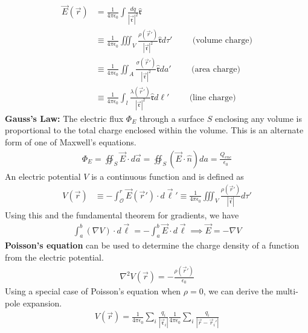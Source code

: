 \begin{align}
	\vec{E}(\vec{r}) &= \frac{1}{4\pi\epsilon_0}\int \frac{dq}{|\vec{\mathfrak{r}}|^2}\hat{\mathfrak{r}} \\
	&\equiv \frac{1}{4\pi\epsilon_0}\iiint_V \frac{\rho(\vec{r}')}{|\vec{\mathfrak{r}}|^2}\hat{\mathfrak{r}}d\tau'\hspace{1cm}\textrm{(volume charge)}\\
	&\equiv \frac{1}{4\pi\epsilon_0}\iint_A \frac{\sigma(\vec{r}')}{|\vec{\mathfrak{r}}|^2}\hat{\mathfrak{r}}da'\hspace{1cm}\textrm{(area charge)}\\
	&\equiv \frac{1}{4\pi\epsilon_0}\int_l \frac{\lambda(\vec{r}')}{|\vec{\mathfrak{r}}|^2}\hat{\mathfrak{r}}d\ell'\hspace{1cm}\textrm{(line charge)}
\end{align}
\textbf{Gauss's Law:} The electric flux $\Phi_E$ through a surface $S$ enclosing any volume is proportional to the total charge enclosed within the volume. This is an alternate form of one of Maxwell's equations.
\begin{align}
	\Phi_E = \oiint_S \vec{E} \cdot d\vec{a} = \oiint_S (\vec{E} \cdot \hat{n}) da = \frac{Q_{enc}}{\epsilon_0}
\end{align}
An electric potential $V$ is a continuous function and is defined as
\begin{align}
	V(\vec{r}) &\equiv -\int_{\mathcal{O}}^{r}\vec{E}(\vec{r}')\cdot d\vec{\ell}' \equiv \frac{1}{4\pi\epsilon_0}\iiint_V \frac{\rho(\vec{r}')}{|\vec{\mathfrak{r}}|}d\tau'
\end{align} 
Using this and the fundamental theorem for gradients, we have
\begin{align}
	\int_{a}^{b}(\nabla V)\cdot d\vec{\ell}=-\int_{a}^{b}\vec{E}\cdot d\vec{\ell} \implies \vec{E} = -\nabla V
\end{align} 
\textbf{Poisson's equation} can be used to determine the charge density of a function from the electric potential. 
\begin{align}
	\nabla^2 V(\vec{r}) = -\frac{\rho(\vec{r}')}{\epsilon_0}
\end{align} 
Using a special case of Poisson's equation when $\rho =0$, we can derive the multi-pole expansion.
\begin{align}
	V(\vec{r}) = \frac{1}{4\pi\epsilon_0}\sum_{i}\frac{q_i}{|\vec{\mathfrak{r}}_i|}\frac{1}{4\pi\epsilon_0}\sum_{i}\frac{q_i}{|\vec{r}-\vec{r}_i'|}
\end{align}
